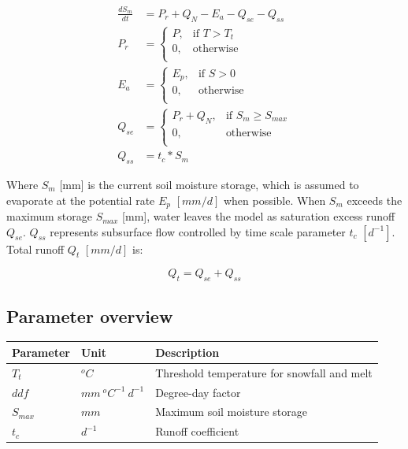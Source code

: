 \begin{align}
	\frac{dS_m}{dt} &= P_r + Q_N - E_a  - Q_{se} - Q_{ss}\\
	P_r &= \begin{cases}
		P, &\text{if } T > T_t \\
		0, & \text{otherwise} \\
	\end{cases} \\
	E_a &= \begin{cases}
		E_p, &\text{if } S > 0 \\
		0, &\text{otherwise} \\
	\end{cases} \\
	Q_{se} &= \begin{cases}
		P_r + Q_N, &\text{if } S_m \geq S_{max}\\
		0, &\text{otherwise}\\
	\end{cases}\\
	Q_{ss} &= t_c*S_m	
\end{align}

Where $S_m$ [mm] is the current soil moisture storage, which is assumed to evaporate at the potential rate $E_p$ $[mm/d]$ when possible. When $S_m$ exceeds the maximum storage $S_{max}$ [mm], water leaves the model as saturation excess runoff $Q_{se}$. $Q_{ss}$ represents subsurface flow controlled by time scale parameter $t_c$ $[d^{-1}]$. Total runoff $Q_t$ $[mm/d]$ is:

\begin{equation}
	Q_t = Q_{se} + Q_{ss}
\end{equation}

\subsection{Parameter overview}
\begin{table}[htbp]
  \centering
    \begin{tabular}{lll}
    \toprule
    Parameter & Unit  & Description \\
    \midrule
    $T_t$ & $^oC$ & Threshold temperature for snowfall and melt \\
    $ddf$ & $mm~^oC^{-1}~d^{-1}$ & Degree-day factor \\
    $S_{max}$ & $mm$  & Maximum soil moisture storage \\
    $t_c$ & $d^{-1}$ & Runoff coefficient \\
    \bottomrule
    \end{tabular}%
  \label{tab:addlabel}%
\end{table}%

